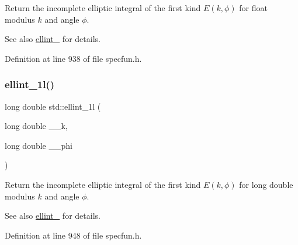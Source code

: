 Return the incomplete elliptic integral of the first kind $ E(k,\phi) $ for {\ttfamily float} modulus $ k $ and angle $ \phi $.

\begin{DoxySeeAlso}{See also}
\hyperlink{group__cxx17__math__spec__func_ga1550d6947bbbeee9865aabd398102a36}{ellint\+\_} for details. 
\end{DoxySeeAlso}


Definition at line 938 of file specfun.\+h.

\mbox{\label{group__cxx17__math__spec__func_ga795383fa51e02351000b410b478d824f}} 
\subsubsection{\texorpdfstring{ellint\+\_\+1l()}{ellint\_1l()}}
{\footnotesize\ttfamily long double std\+::ellint\+\_\+1l (\begin{DoxyParamCaption}\item[{long double}]{\+\_\+\+\_\+k,  }\item[{long double}]{\+\_\+\+\_\+phi }\end{DoxyParamCaption})\hspace{0.3cm}{\ttfamily [inline]}}

Return the incomplete elliptic integral of the first kind $ E(k,\phi) $ for {\ttfamily long double} modulus $ k $ and angle $ \phi $.

\begin{DoxySeeAlso}{See also}
\hyperlink{group__cxx17__math__spec__func_ga1550d6947bbbeee9865aabd398102a36}{ellint\+\_} for details. 
\end{DoxySeeAlso}


Definition at line 948 of file specfun.\+h.

\mbox{\label{group__cxx17__math__spec__func_gad64cb9babb7837d585912b1a94b2cb7d}} 
